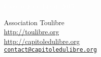 \documentclass{cdl_sponsor}
\begin{document}
\thispagestyle{empty} %



\parbox[t]{1.0\textwidth}{
	\flushright \fontsize{45pt}{60pt}\selectfont %
	\vspace*{0.7cm} %
		
	\textcolor{white}{
		\hfill \textsc{Capitole du Libre 2015} \\
		\fontsize{36pt}{50pt}
	}
	\par
	
	\vspace*{0.7cm} %
}




\vfill %

{\centering \large 
\hfill Association Toulibre \\
\hfill \url{http://toulibre.org} \\
\hfill \url{http://capitoledulibre.org} \\
\hfill \href{mailto:contact@capitoledulibre.org}{\texttt{contact@capitoledulibre.org}} \\
}
\clearpage
\end{document}
